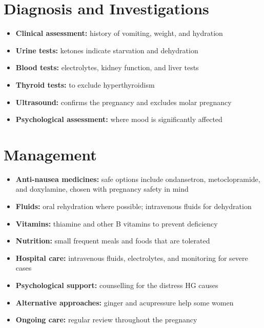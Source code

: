 \section*{Diagnosis and Investigations}
\begin{itemize}
    \item \textbf{Clinical assessment:} history of vomiting, weight, and hydration
    \item \textbf{Urine tests:} ketones indicate starvation and dehydration
    \item \textbf{Blood tests:} electrolytes, kidney function, and liver tests
    \item \textbf{Thyroid tests:} to exclude hyperthyroidism
    \item \textbf{Ultrasound:} confirms the pregnancy and excludes molar pregnancy
    \item \textbf{Psychological assessment:} where mood is significantly affected
\end{itemize}

\section*{Management}
\begin{itemize}
    \item \textbf{Anti-nausea medicines:} safe options include ondansetron, metoclopramide, and doxylamine, chosen with pregnancy safety in mind
    \item \textbf{Fluids:} oral rehydration where possible; intravenous fluids for dehydration
    \item \textbf{Vitamins:} thiamine and other B vitamins to prevent deficiency
    \item \textbf{Nutrition:} small frequent meals and foods that are tolerated
    \item \textbf{Hospital care:} intravenous fluids, electrolytes, and monitoring for severe cases
    \item \textbf{Psychological support:} counselling for the distress HG causes
    \item \textbf{Alternative approaches:} ginger and acupressure help some women
    \item \textbf{Ongoing care:} regular review throughout the pregnancy
\end{itemize}

